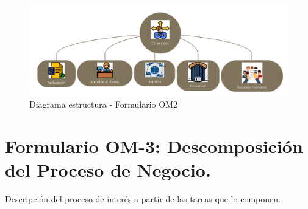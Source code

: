 \begin{figure}[H]
	\centering
	\includegraphics[scale=0.50]{imaxes/Organigrama.png}
	\caption{\label{fig:diagramaEstructura}Diagrama estructura - Formulario OM2}
\end{figure}

\section{Formulario OM-3: Descomposición del Proceso de Negocio.}

Descripción del proceso de interés a partir de las tareas que lo componen.

